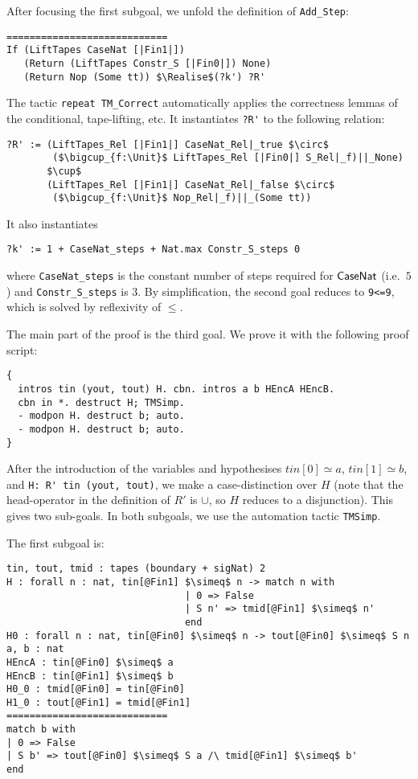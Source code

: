 After focusing the first subgoal, we unfold the definition of \lstinline!Add_Step!:
\begin{lstlisting}
============================
If (LiftTapes CaseNat [|Fin1|])
   (Return (LiftTapes Constr_S [|Fin0|]) None)
   (Return Nop (Some tt)) $\Realise$(?k') ?R'
\end{lstlisting}

The tactic \lstinline!repeat TM_Correct! automatically applies the correctness lemmas of the conditional, tape-lifting, etc.  It instantiates
\lstinline!?R'! to the following relation:
\begin{lstlisting}
?R' := (LiftTapes_Rel [|Fin1|] CaseNat_Rel|_true $\circ$
        ($\bigcup_{f:\Unit}$ LiftTapes_Rel [|Fin0|] S_Rel|_f)||_None)
       $\cup$
       (LiftTapes_Rel [|Fin1|] CaseNat_Rel|_false $\circ$
        ($\bigcup_{f:\Unit}$ Nop_Rel|_f)||_(Some tt))
\end{lstlisting}
It also instantiates
\begin{lstlisting}
?k' := 1 + CaseNat_steps + Nat.max Constr_S_steps 0
\end{lstlisting}
where \lstinline!CaseNat_steps! is the constant number of steps required for $\mathsf{CaseNat}$ (i.e.\ $5$) and \lstinline!Constr_S_steps! is $3$.  By
simplification, the second goal reduces to \lstinline!9<=9!, which is solved by reflexivity of $\leq$.

The main part of the proof is the third goal.  We prove it with the following proof script:
\begin{lstlisting}
{
  intros tin (yout, tout) H. cbn. intros a b HEncA HEncB.
  cbn in *. destruct H; TMSimp.
  - modpon H. destruct b; auto.
  - modpon H. destruct b; auto.
}
\end{lstlisting}

After the introduction of the variables and hypothesises $tin[0] \simeq a$, $tin[1] \simeq b$, and \lstinline!H: R' tin (yout, tout)!, we make a
case-distinction over $H$ (note that the head-operator in the definition of $R'$ is $\cup$, so $H$ reduces to a disjunction).  This gives two
sub-goals.  In both subgoals, we use the automation tactic \lstinline!TMSimp!.

The first subgoal is:
\begin{lstlisting}
tin, tout, tmid : tapes (boundary + sigNat) 2
H : forall n : nat, tin[@Fin1] $\simeq$ n -> match n with
                               | 0 => False
                               | S n' => tmid[@Fin1] $\simeq$ n'
                               end
H0 : forall n : nat, tin[@Fin0] $\simeq$ n -> tout[@Fin0] $\simeq$ S n
a, b : nat
HEncA : tin[@Fin0] $\simeq$ a
HEncB : tin[@Fin1] $\simeq$ b
H0_0 : tmid[@Fin0] = tin[@Fin0]
H1_0 : tout[@Fin1] = tmid[@Fin1]
============================
match b with
| 0 => False
| S b' => tout[@Fin0] $\simeq$ S a /\ tmid[@Fin1] $\simeq$ b'
end
\end{lstlisting}

